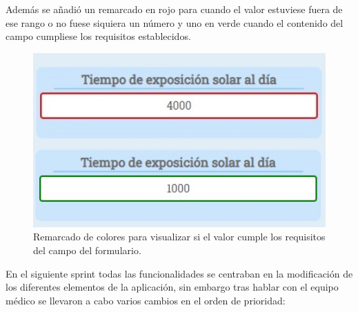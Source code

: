 Además se añadió un remarcado en rojo para cuando el valor estuviese fuera de ese rango o no fuese siquiera un número y uno en verde cuando el contenido del campo cumpliese los requisitos establecidos.

\begin{figure}[h]
    \centering
     \includegraphics[width=1\textwidth]{images/remarcadoRojo.jpg}
    \caption{Remarcado de colores para visualizar si el valor cumple los requisitos del campo del formulario.}
\end{figure}
\newpage

En el siguiente sprint todas las funcionalidades se centraban en la modificación de los diferentes elementos de la aplicación, sin embargo tras hablar con el equipo médico se llevaron a cabo varios cambios en el orden de prioridad:

